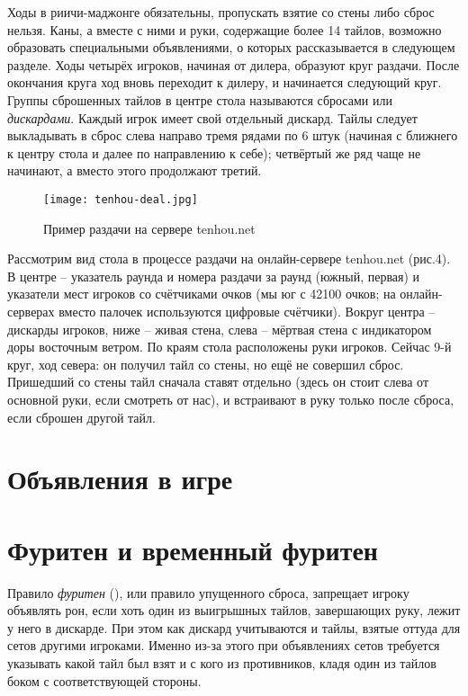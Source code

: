 Ходы в риичи-маджонге обязательны, пропускать взятие со стены либо сброс нельзя. Каны, а вместе с ними и руки, содержащие более 14 тайлов, возможно образовать специальными объявлениями, о которых рассказывается в следующем разделе. Ходы четырёх игроков, начиная от дилера, образуют круг раздачи. После окончания круга ход вновь переходит к дилеру, и начинается следующий круг. Группы сброшенных тайлов в центре стола называются сбросами или \textit{дискардами}. Каждый игрок имеет свой отдельный дискард. Тайлы следует выкладывать в сброс слева направо тремя рядами по 6 штук (начиная с ближнего к центру стола и далее по направлению к себе); четвёртый же ряд чаще не начинают, а вместо этого продолжают третий.

\begin{figure}[H]
	\centering
	\texttt{[image: tenhou-deal.jpg]}
	\caption{Пример раздачи на сервере tenhou.net}
\end{figure}

Рассмотрим вид стола в процессе раздачи на онлайн-сервере tenhou.net (рис.4). В центре – указатель раунда и номера раздачи за раунд (южный, первая) и указатели мест игроков со счётчиками очков (мы юг с 42100 очков; на онлайн-серверах вместо палочек используются цифровые счётчики). Вокруг центра – дискарды игроков, ниже – живая стена, слева – мёртвая стена с индикатором доры восточным ветром. По краям стола расположены руки игроков. Сейчас 9-й круг, ход севера: он получил тайл со стены, но ещё не совершил сброс. Пришедший со стены тайл сначала ставят отдельно (здесь он стоит слева от основной руки, если смотреть от нас), и встраивают в руку только после сброса, если сброшен другой тайл.

\section{Объявления в игре}


\section{Фуритен и временный фуритен}

Правило \textit{фуритен} (), или правило упущенного сброса, запрещает игроку объявлять рон, если хоть один из выигрышных тайлов, завершающих руку, лежит у него в дискарде. При этом как дискард учитываются и тайлы, взятые оттуда для сетов другими игроками. Именно из-за этого при объявлениях сетов требуется указывать какой тайл был взят и с кого из противников, кладя один из тайлов боком с соответствующей стороны.

